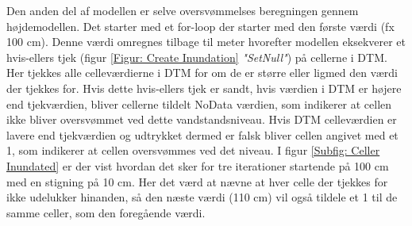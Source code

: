 Den anden del af modellen er selve oversvømmelses beregningen gennem højdemodellen. Det starter med et for-loop der starter med den første værdi (fx 100 cm). Denne værdi omregnes tilbage til meter hvorefter modellen eksekverer et hvis-ellers tjek (figur \ref{Figur: Create Inundation} \textit{"SetNull"}) på cellerne i DTM. Her tjekkes alle celleværdierne i DTM for om de er større eller ligmed den værdi der tjekkes for. Hvis dette hvis-ellers tjek er sandt, hvis værdien i DTM er højere end tjekværdien, bliver cellerne tildelt NoData værdien, som indikerer at cellen ikke bliver oversvømmet ved dette vandstandsniveau. Hvis DTM celleværdien er lavere end tjekværdien og udtrykket dermed er falsk bliver cellen angivet med et 1, som indikerer at cellen oversvømmes ved det niveau. I figur \ref{Subfig: Celler Inundated} er der vist hvordan det sker for tre iterationer startende på 100 cm med en stigning på 10 cm. Her det værd at nævne at hver celle der tjekkes for ikke udelukker hinanden, så den næste værdi (110 cm) vil også tildele et 1 til de samme celler, som den foregående værdi. 
